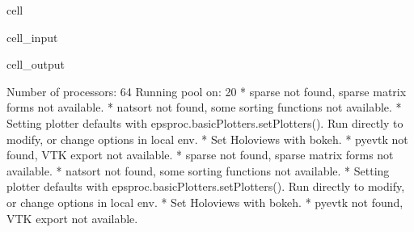 \documentclass[letterpaper,table,10pt,english]{jupyterBook}
\begin{document}
\begin{sphinxuseclass}{cell}\begin{sphinxVerbatimInput}

\begin{sphinxuseclass}{cell_input}
\begin{sphinxVerbatim}[commandchars=\\\{\}]
  \PYG{p}{[}\PYG{p}{]} 
\end{sphinxVerbatim}

\end{sphinxuseclass}\end{sphinxVerbatimInput}
\begin{sphinxVerbatimOutput}

\begin{sphinxuseclass}{cell_output}
\begin{sphinxVerbatim}[commandchars=\\\{\}]
Number of processors:  64 
Running pool on:  20
* sparse not found, sparse matrix forms not available. 
* natsort not found, some sorting functions not available. 
* Setting plotter defaults with epsproc.basicPlotters.setPlotters(). Run directly to modify, or change options in local env.
* Set Holoviews with bokeh.
* pyevtk not found, VTK export not available. 
* sparse not found, sparse matrix forms not available. 
* natsort not found, some sorting functions not available. 
* Setting plotter defaults with epsproc.basicPlotters.setPlotters(). Run directly to modify, or change options in local env.
* Set Holoviews with bokeh.
* pyevtk not found, VTK export not available. 
\end{sphinxVerbatim}


\end{sphinxuseclass}
\end{sphinxVerbatimOutput}
\end{sphinxuseclass}
\end{document}
